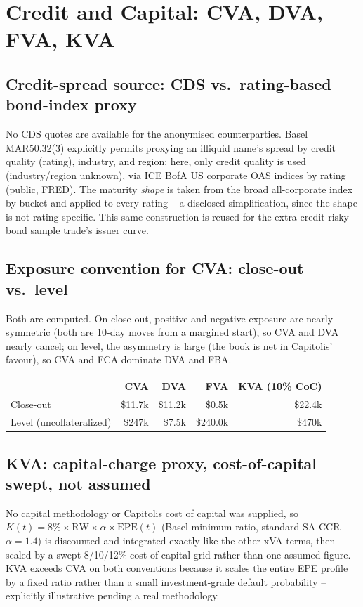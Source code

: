 \documentclass[10pt,letterpaper]{article}
\begin{document}
\section{Credit and Capital: CVA, DVA, FVA, KVA}

\subsection{Credit-spread source: CDS vs.\ rating-based bond-index proxy}
No CDS quotes are available for the anonymised counterparties. Basel MAR50.32(3) explicitly permits proxying an illiquid name's spread by credit quality (rating), industry, and region; here, only credit quality is used (industry/region unknown), via ICE BofA US corporate OAS indices by rating (public, FRED). The maturity \emph{shape} is taken from the broad all-corporate index by bucket and applied to every rating -- a disclosed simplification, since the shape is not rating-specific. This same construction is reused for the extra-credit risky-bond sample trade's issuer curve.

\subsection{Exposure convention for CVA: close-out vs.\ level}
Both are computed. On close-out, positive and negative exposure are nearly symmetric (both are 10-day moves from a margined start), so CVA and DVA nearly cancel; on level, the asymmetry is large (the book is net in Capitolis' favour), so CVA and FCA dominate DVA and FBA.
\begin{center}\small
\begin{tabular}{lrrrr}
\toprule
& \textbf{CVA} & \textbf{DVA} & \textbf{FVA} & \textbf{KVA (10\% CoC)} \\
\midrule
Close-out & \$11.7k & \$11.2k & \$0.5k & \$22.4k \\
Level (uncollateralized) & \$247k & \$7.5k & \$240.0k & \$470k \\
\bottomrule
\end{tabular}
\end{center}

\subsection{KVA: capital-charge proxy, cost-of-capital swept, not assumed}
No capital methodology or Capitolis cost of capital was supplied, so $K(t)=8\%\times\text{RW}\times\alpha\times\text{EPE}(t)$ (Basel minimum ratio, standard SA-CCR $\alpha=1.4$) is discounted and integrated exactly like the other xVA terms, then scaled by a swept 8/10/12\% cost-of-capital grid rather than one assumed figure. KVA exceeds CVA on both conventions because it scales the entire EPE profile by a fixed ratio rather than a small investment-grade default probability -- explicitly illustrative pending a real methodology.
\end{document}
